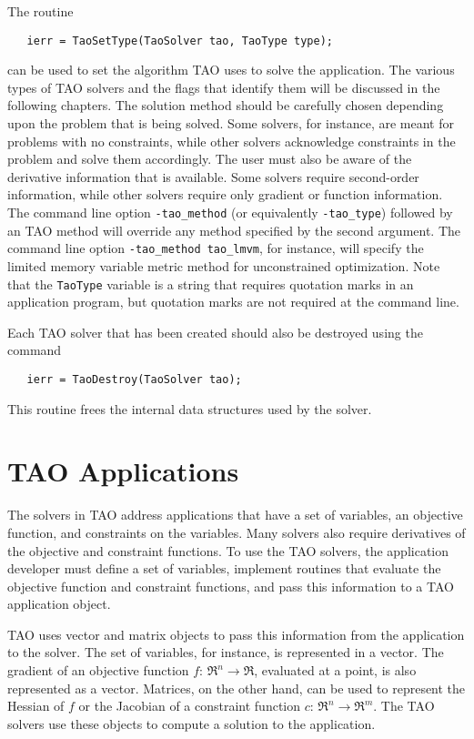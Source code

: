 The routine
\begin{verbatim}
   ierr = TaoSetType(TaoSolver tao, TaoType type);
\end{verbatim}
\noindent
can be used to set the algorithm TAO uses to solve the application.
The various types of TAO solvers and the flags that identify them 
will be discussed in the following chapters.
The solution method should be carefully chosen depending upon
the problem that is being solved.  Some solvers, for instance, are meant for
problems with no constraints, while other solvers acknowledge constraints
in the problem and solve them accordingly.
The user must also be aware of the derivative information that is available.
Some solvers require second-order information, while other solvers require
only gradient or function information.
The command line option \texttt{-tao\_method} (or equivalently 
\texttt{-tao\_type}) followed by an TAO method
will override any method specified by the second argument.
The command line option {\tt -tao\_method tao\_lmvm}, for instance,
will specify the limited memory variable metric method for unconstrained
optimization.  Note that the {\tt TaoType} variable is a string that requires
quotation marks in an application program, but quotation marks are not required
at the command line.

Each TAO solver that has been created should also be destroyed using
the command 
\begin{verbatim}
   ierr = TaoDestroy(TaoSolver tao);
\end{verbatim}
\noindent 
This routine frees the internal data structures used by the solver.


\section{TAO Applications}
\label{section:taoapplication}
\label{section:petscapp}

The solvers in TAO address applications that have a set of variables, an objective
function, and constraints on the variables.  Many solvers also require derivatives
of the objective and constraint functions.
To use the TAO solvers, the application developer must 
define a set of variables, implement routines that evaluate the 
objective function and constraint functions, and pass this information
to a TAO application object.   

TAO uses vector and matrix objects to pass this information from the
application to the solver.   The set of variables, for instance, is
represented in a vector.
The gradient of an objective function $f: \, \Re^n \to \Re$,
evaluated at a point, is also represented as a vector.
Matrices,  on the other hand,
can be used to represent the Hessian of $f$ or the Jacobian of a constraint
function $c: \, \Re^n \to \Re^m$.  The TAO solvers use
these objects to compute a solution to the application.

